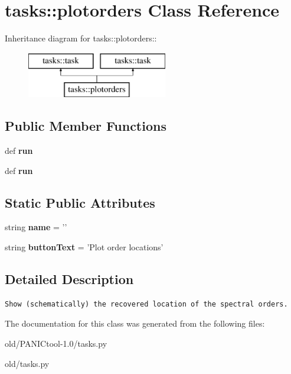 \section{tasks::plotorders Class Reference}
\label{classtasks_1_1plotorders}
Inheritance diagram for tasks::plotorders::\begin{figure}[H]
\begin{center}
\leavevmode
\includegraphics[height=2cm]{classtasks_1_1plotorders}
\end{center}
\end{figure}
\subsection*{Public Member Functions}
\begin{CompactItemize}
\item 
def \textbf{run}\label{classtasks_1_1plotorders_ecce56a8e01f10a140447e4d72ee0345}

\item 
def \textbf{run}\label{classtasks_1_1plotorders_ecce56a8e01f10a140447e4d72ee0345}

\end{CompactItemize}
\subsection*{Static Public Attributes}
\begin{CompactItemize}
\item 
string \textbf{name} = '{\bfplotorders}'\label{classtasks_1_1plotorders_0c6084994b35b41a52c644a4c210711d}

\item 
string \textbf{button\-Text} = 'Plot order locations'\label{classtasks_1_1plotorders_cfa6bb99516329101ddf983993a72031}

\end{CompactItemize}


\subsection{Detailed Description}


\footnotesize\begin{verbatim}Show (schematically) the recovered location of the spectral orders.
\end{verbatim}
\normalsize
 



The documentation for this class was generated from the following files:\begin{CompactItemize}
\item 
old/PANICtool-1.0/tasks.py\item 
old/tasks.py\end{CompactItemize}
